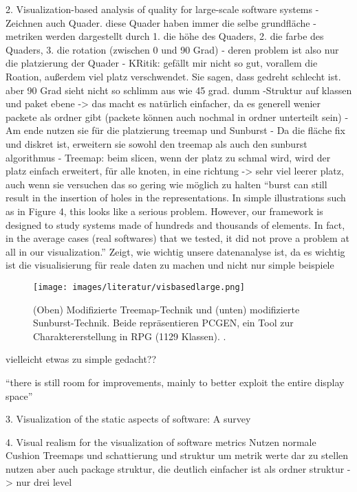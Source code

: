 2. Visualization-based analysis of quality for large-scale software systems \cite{visbasedlarge}
- Zeichnen auch Quader. diese Quader haben immer die selbe grundfläche
- metriken werden dargestellt durch 1. die höhe des Quaders, 2. die farbe des Quaders, 3. die rotation (zwischen 0 und 90 Grad) 
- deren problem ist also nur die platzierung der Quader
- KRitik: gefällt mir nicht so gut, vorallem die Roation, außerdem viel platz verschwendet. Sie sagen, dass gedreht schlecht ist. aber 90 Grad sieht nicht so schlimm aus wie 45 grad. dumm
-Struktur auf klassen und paket ebene -> das macht es natürlich einfacher, da es generell wenier packete als ordner gibt (packete können auch nochmal in ordner unterteilt sein)
- Am ende nutzen sie für die platzierung treemap und Sunburst
- Da die fläche fix und diskret ist, erweitern sie sowohl den treemap als auch den sunburst algorithmus
- Treemap: beim slicen, wenn der platz zu schmal wird, wird der platz einfach erweitert, für alle knoten, in eine richtung -> sehr viel leerer platz, auch wenn sie versuchen das so gering wie möglich zu halten
\enquote{burst can still result in the insertion of holes in the representations. In simple illustrations such as in Figure 4, this looks like a serious problem. However, our framework is designed to study systems made of hundreds and thousands of elements. In fact, in the average cases (real softwares) that we tested, it did not prove a problem at all in our visualization.}
Zeigt, wie wichtig unsere datenanalyse ist, da es wichtig ist die visualisierung für reale daten zu machen und nicht nur simple beispiele

\begin{figure}
    \centering
    \texttt{[image: images/literatur/visbasedlarge.png]}
    \caption{(Oben) Modifizierte Treemap-Technik und (unten) modifizierte Sunburst-Technik. Beide repräsentieren PCGEN, ein Tool zur Charaktererstellung in RPG (1129 Klassen). \cite[5]{visbasedlarge}.}
    \label{fig:visbasedlarge}
\end{figure}
vielleicht etwas zu simple gedacht??


\enquote{there is still room for improvements, mainly to better exploit the entire display space}\cite[8]{visbasedlarge}

3. Visualization of the static aspects of software: A survey \cite{staticSurvey}



4. Visual realism for the visualization of software metrics \cite{visRealism}
Nutzen normale Cushion Treemaps und schattierung und struktur um metrik werte dar zu stellen
nutzen aber auch package struktur, die deutlich einfacher ist als ordner struktur -> nur drei level

